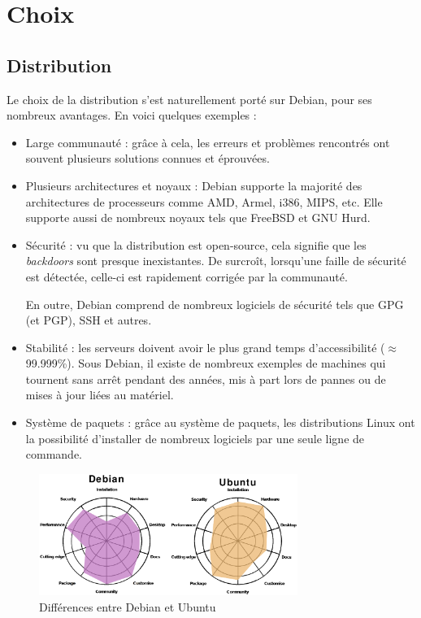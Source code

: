 \section{Choix}
\label{sec:choix}

\subsection{Distribution}
\label{subsec:distribution}

Le choix de la distribution s'est naturellement porté sur Debian, pour ses
nombreux avantages. En voici quelques exemples :
\begin{itemize}
\item Large communauté : grâce à cela, les erreurs et problèmes rencontrés ont
  souvent plusieurs solutions connues et éprouvées.

\item Plusieurs architectures et noyaux : Debian supporte la majorité des
  architectures de processeurs comme AMD, Armel, i386, MIPS, etc. Elle supporte
  aussi de nombreux noyaux tels que FreeBSD et GNU Hurd.

\item Sécurité : vu que la distribution est open-source, cela signifie que les
\textit{backdoors} sont presque inexistantes. De surcroît, lorsqu'une faille de
sécurité est détectée, celle-ci est rapidement corrigée par la communauté.

  En outre, Debian comprend de nombreux logiciels de sécurité tels que GPG (et
  PGP), SSH et autres.

\item Stabilité : les serveurs doivent avoir le plus grand temps d'accessibilité
($\approx$ 99.999\%). Sous Debian, il existe de nombreux exemples de machines
qui tournent sans arrêt pendant des années, mis à part lors de pannes ou de
mises à jour liées au matériel.

\item Système de paquets : grâce au système de paquets, les distributions Linux
  ont la possibilité d'installer de nombreux logiciels par une seule ligne de
  commande.
\end{itemize}

\begin{figure}[!h]
  \centering
  \includegraphics[width=0.75\textwidth]
  {textures/images/installation/DebianVsUbuntu.eps}
  \caption{Différences entre Debian et Ubuntu}
  \label{fig:diff-debian-ubuntu}
\end{figure}

